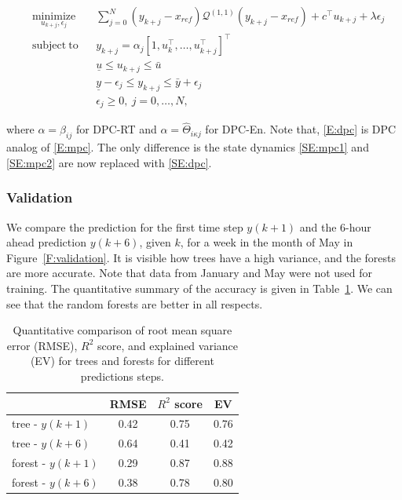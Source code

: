 \begin{subequations}
	\begin{align}
	& \underset{u_{k+j},\epsilon_j}{\mathrm{minimize}} & & \sum_{j=0}^{N} (y_{k+j}-x_{ref})\mathcal{Q}^{(1,1)} (y_{k+j}-x_{ref})+c^\top u_{k+j}+\lambda\epsilon_j \\
	& \mathrm{subject\ to }                              & & y_{k+j} =  \alpha_j \left[1,u^\top_{k},\ldots,u^\top_{k+j} \right]^\top \label{SE:dpc}               \\
	&                                                    & & \underline{u} \leq u_{k+j} \leq \bar{u} 	                                                          \\
	&                                                    & & \underline{y} - \epsilon_j \leq y_{k+j} \leq \bar{y} + \epsilon_j                                    \\
	&                                                    & & \epsilon_j \geq 0, \ j = 0,\dots,N,            									                 
	\end{align}\label{E:dpc}
\end{subequations} 

\noindent where $\alpha = \beta_{ij}$ for DPC-RT and $\alpha = \hat{\Theta}_{i\kappa j}$ for DPC-En.
Note that, \eqref{E:dpc} is DPC analog of \eqref{E:mpc}. The only difference is the state dynamics \eqref{SE:mpc1} and \eqref{SE:mpc2} are now replaced with \eqref{SE:dpc}.

\subsubsection{Validation} 
\label{SSS:dpc_val}

We compare the prediction for the first time step $y(k+1)$ and the 6-hour ahead prediction $y(k+6)$, given $k$, for a week in the month of May in Figure~\ref{F:validation}. It is visible how trees have a high variance, and the forests are more accurate. Note that data from January and May were not used for training. The quantitative summary of the accuracy is given in Table~\ref{T:validation}. We can see that the random forests are better in all respects.
\begin{table}[h!]
	\centering
	\begin{tabular}{lccc}
		\toprule
		                 & RMSE & $R^2$ score & EV  \\ 
		\midrule
		tree - $y(k+1)$    & 0.42 & 0.75        & 0.76 \\
		tree - $y(k+6)$    & 0.64 & 0.41        & 0.42 \\
		forest - $y(k+1)$  & 0.29 & 0.87        & 0.88 \\
		forest - $y(k+6)$  & 0.38 & 0.78        & 0.80 \\
		\bottomrule
	\end{tabular}
	\caption{Quantitative comparison of root mean square error (RMSE), $R^2$ score, and explained variance (EV) for trees and forests for different predictions steps.}
	\captionsetup{justification=centering}
	\label{T:validation}
\end{table}

